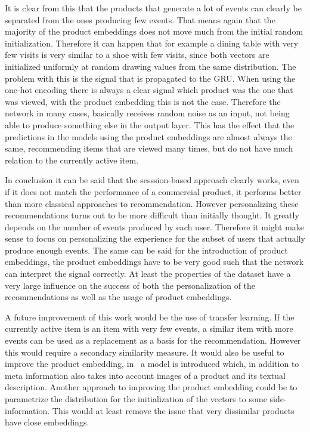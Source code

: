 It is clear from this that the products that generate a lot of events can clearly be separated from the ones producing few events.
That means again that the majority of the product embeddings does not move much from the initial random initialization.
Therefore it can happen that for example a dining table with very few visits is very similar to a shoe with few visits, since both vectors are initialized uniformly at random drawing values from the same distribution.
The problem with this is the signal that is propagated to the GRU.
When using the one-hot encoding there is always a clear signal which product was the one that was viewed, with the product embedding this is not the case.
Therefore the network in many cases, basically receives random noise as an input, not being able to produce something else in the output layer.
This has the effect that the predictions in the models using the product embeddings are almost always the same, recommending items that are viewed many times, but do not have much relation to the currently active item.
\par
In conclusion it can be said that the sesssion-based approach clearly works, even if it does not match the performance of a commercial product, it performs better than more classical approaches to recommendation.
However personalizing these recommendations turns out to be more difficult than initially thought.
It greatly depends on the number of events produced by each user.
Therefore it might make sense to focus on personalizing the experience for the subset of users that actually produce enough events.
The same can be said for the introduction of product embeddings, the product embeddings have to be very good such that the network can interpret the signal correctly.
At least the properties of the dataset have a very large influence on the success of both the personalization of the recommendations as well as the usage of product embeddings.
\par
A future improvement of this work would be the use of transfer learning.
If the currently active item is an item with very few events, a similar item with more events can be used as a replacement as a basis for the recommendation.
However this would require a secondary similarity measure.
It would also be useful to improve the product embedding, in~\cite{content2vec} a model is introduced which, in addition to meta information also takes into account images of a product and its textual description.
Another approach to improving the product embedding could be to parametrize the distribution for the initialization of the vectors to some side-information.
This would at least remove the issue that very dissimilar products have close embeddings.
